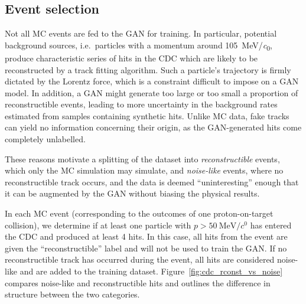 \subsection{Event selection}\label{sec:gan_event_selection}


Not all MC events are fed to the GAN for training. In particular, potential
background sources, i.e.\ particles with a momentum around
\SI{105}{MeV/\clight}, produce characteristic series of hits in the CDC which
are likely to be reconstructed by a track fitting algorithm. Such a particle's
trajectory is firmly dictated by the Lorentz force, which is a constraint
difficult to impose on a GAN model. In addition, a GAN might generate too large
or too small a proportion of reconstructible events, leading to more uncertainty
in the background rates estimated from samples containing synthetic hits. Unlike
MC data, fake tracks can yield no information concerning their origin, as the
GAN-generated hits come completely unlabelled.

These reasons motivate a splitting of the dataset into \emph{reconstructible}
events, which only the MC simulation may simulate, and \emph{noise-like} events,
where no reconstructible track occurs, and the data is deemed ``uninteresting''
enough that it can be augmented by the GAN without biasing the physical results.


In each MC event (corresponding to the outcomes of one proton-on-target
collision), we determine if at least one particle with $p >
\SI{50}{\MeV/\clight}$ has entered the CDC and produced at least 4 hits. In this
case, all hits from the event are given the ``reconstructible'' label and will
not be used to train the GAN. If no reconstructible track has occurred during
the event, all hits are considered noise-like and are added to the training
dataset. Figure~\ref{fig:cdc_rconst_vs_noise} compares noise-like and
reconstructible hits and outlines the difference in structure between the two
categories.

